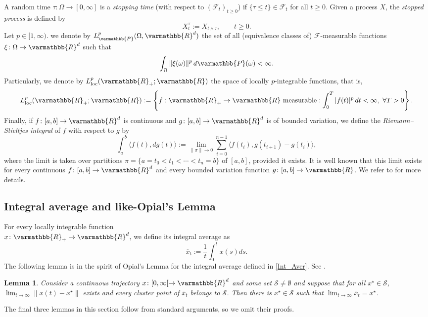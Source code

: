 \documentclass[11pt,reqno]{article}
\let\mathbb=\varmathbb
\newcommand{\R}{\mathbb{R}}
\newcommand{\1}{\mathds{1}}
\newcommand{\Aver}[2]{\overline{#1}_{#2}}
\numberwithin{equation}{section}  %
\theoremstyle{plain}
\newtheorem{lemma}[theorem]{Lemma}
\theoremstyle{definition}
\theoremstyle{remark}
\numberwithin{theorem}{section}
\numberwithin{remark}{section}
\numberwithin{example}{section}
\begin{document}
\noindent A random time $\tau\colon \Omega\to[0,\infty]$ is a \emph{stopping time} 
(with respect to $(\mathcal{F}_t)_{t\ge 0}$) if $\{\tau\le t\}\in\mathcal{F}_t$ for all 
$t\ge 0$. Given a process $X$,  the \emph{stopped process} is defined by 
\[
   X_t^\tau := X_{t\wedge \tau}, \qquad t\ge 0.
\]
Let $p \in [1, \infty)$. we denote by  $L_{\mathbb{P}}^{p}(\Omega, \mathbb{R}^d)
$   
the set of all (equivalence classes of) $\mathcal{F}$-measurable functions 
$\xi \colon \Omega \to \mathbb{R}^d$ such that
\[
\int_{\Omega} \|\xi(\omega)\|^{p} \, d\mathbb{P}(\omega) < \infty.
\]
Particularly, we denote by $L^p_{\mathrm{loc}}(\mathbb{R}_+;\mathbb{R})$ 
the space of locally $p$-integrable functions, that is,
\[
  L^p_{\mathrm{loc}}(\mathbb{R}_+;\mathbb{R})
  := \left\{ f:\mathbb{R}_+\to\mathbb{R}\ \text{measurable} : 
      \int_0^T |f(t)|^p\,dt < \infty,\ \forall T>0 \right\}.
\]
Finally, if $f\colon [a,b]\to \mathbb{R}^d$ is continuous and 
$g\colon [a,b]\to \mathbb{R}^d$ is of bounded variation, we define the 
\emph{Riemann–Stieltjes integral} of $f$ with respect to $g$ by
\[
   \int_a^b \langle f(t) , dg(t)  \rangle 
   := \lim_{\|\pi\|\to 0} \sum_{i=0}^{n-1} \langle f(t_i), g(t_{i+1})-g(t_i)\rangle,
\]
where the limit is taken over partitions 
$\pi=\{a=t_0<t_1<\cdots<t_n=b\}$ of $[a,b]$, provided it exists.
It is well known that this limit exists for every continuous 
$f\colon [a,b]\to \mathbb{R}^d$ and every bounded variation function 
$g\colon [a,b]\to \mathbb{R}$. We refer to \cite{MR957087} for more details.

 


 \subsection{Integral average and like-Opial’s Lemma}
    For every locally integrable function \\ $x\colon \R_+\to \R^d$, we define its integral average as 
    \begin{equation}\label{Int_Aver}
        \Aver{x}{t} := \frac{1}{t}\int_0^t x(s)ds.
    \end{equation}  
The following lemma is in the spirit of Opial's Lemma for the integral average defined in \eqref{Int_Aver}. See \cite[Lemma 2.3]{MR2593044}. 
    \begin{lemma}\label{opial-prop}
        Consider a continuous trajectory $x\colon [0,\infty[\to \R^d$ and some set $\mathcal{S}\neq\emptyset$ and suppose that for all $x^\star\in \mathcal{S}$, $\displaystyle\lim_{t\to\infty}\|x(t)-x^\star\|$ exists and every cluster point of $\Aver{x}{t}$ belongs to $\mathcal{S}$. Then there is $x^\star\in \mathcal{S}$ such that $\displaystyle\lim_{t\to \infty}\Aver{x}{t} =x^\star$.
    \end{lemma}
 The final three lemmas in this section follow from standard arguments, so we omit their proofs.
 
\end{document}
